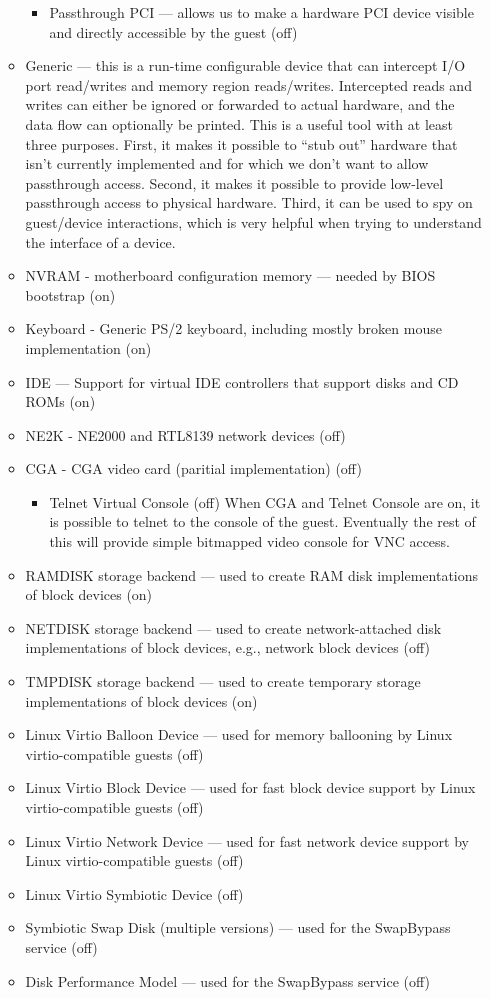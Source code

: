 \documentclass[11pt]{article}
\begin{document}
\begin{itemize}
\begin{itemize}
\begin{itemize}
\item Passthrough PCI --- allows us to make a hardware PCI device visible and
directly accessible by the guest (off)
\end{itemize}
\item Generic --- this is a run-time configurable device that can intercept I/O port read/writes and memory region reads/writes.   Intercepted reads and writes can either be ignored or forwarded to actual hardware, and the data flow can optionally be printed.   This is a useful tool with at least three purposes.  First, it makes it possible to ``stub out'' hardware that isn't currently implemented and for which we don't want to allow passthrough access. Second, it makes it possible to provide low-level passthrough access to physical hardware.   Third, it can be used to spy on guest/device interactions, which is very helpful when trying to understand the interface of a device.
\item NVRAM - motherboard configuration memory --- needed by BIOS bootstrap (on)
\item Keyboard - Generic PS/2 keyboard, including mostly broken mouse
implementation (on)
\item IDE --- Support for virtual IDE controllers that support disks
and CD ROMs (on)

\item NE2K - NE2000 and RTL8139 network devices (off)
\item CGA - CGA video card (paritial implementation) (off)
\begin{itemize}
\item Telnet Virtual Console (off)   When CGA and Telnet Console are
on, it is possible to telnet to the console of the guest.   Eventually
the rest of this will provide simple bitmapped video console for VNC
access.
\end{itemize}
\item RAMDISK storage backend --- used to create RAM disk
implementations of block devices (on)
\item NETDISK storage backend --- used to create network-attached disk
implementations of block devices, e.g., network block devices (off)
\item TMPDISK storage backend --- used to create temporary storage
implementations of block devices (on)
\item Linux Virtio Balloon Device --- used for memory ballooning by
Linux virtio-compatible guests (off)
\item Linux Virtio Block Device --- used for fast block device support
by Linux virtio-compatible guests (off)
\item Linux Virtio Network Device --- used for fast network device support
by Linux virtio-compatible guests (off) 
\item Linux Virtio Symbiotic Device (off)
\item Symbiotic Swap Disk (multiple versions) --- used for the
SwapBypass service (off)
\item Disk Performance Model --- used for the
SwapBypass service (off)
\end{itemize}
\end{itemize}
\end{document}
